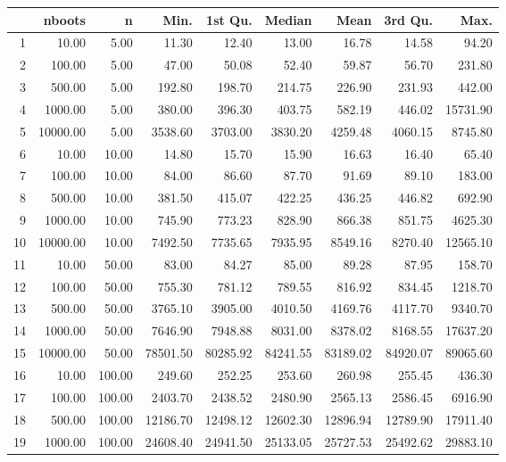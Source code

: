 \begin{table}[ht]
\centering
\begin{tabular}{rrrrrrrrr}
  \hline
 & nboots & n & Min. & 1st Qu. & Median & Mean & 3rd Qu. & Max. \\ 
  \hline
1 & 10.00 & 5.00 & 11.30 & 12.40 & 13.00 & 16.78 & 14.58 & 94.20 \\ 
  2 & 100.00 & 5.00 & 47.00 & 50.08 & 52.40 & 59.87 & 56.70 & 231.80 \\ 
  3 & 500.00 & 5.00 & 192.80 & 198.70 & 214.75 & 226.90 & 231.93 & 442.00 \\ 
  4 & 1000.00 & 5.00 & 380.00 & 396.30 & 403.75 & 582.19 & 446.02 & 15731.90 \\ 
  5 & 10000.00 & 5.00 & 3538.60 & 3703.00 & 3830.20 & 4259.48 & 4060.15 & 8745.80 \\ 
  6 & 10.00 & 10.00 & 14.80 & 15.70 & 15.90 & 16.63 & 16.40 & 65.40 \\ 
  7 & 100.00 & 10.00 & 84.00 & 86.60 & 87.70 & 91.69 & 89.10 & 183.00 \\ 
  8 & 500.00 & 10.00 & 381.50 & 415.07 & 422.25 & 436.25 & 446.82 & 692.90 \\ 
  9 & 1000.00 & 10.00 & 745.90 & 773.23 & 828.90 & 866.38 & 851.75 & 4625.30 \\ 
  10 & 10000.00 & 10.00 & 7492.50 & 7735.65 & 7935.95 & 8549.16 & 8270.40 & 12565.10 \\ 
  11 & 10.00 & 50.00 & 83.00 & 84.27 & 85.00 & 89.28 & 87.95 & 158.70 \\ 
  12 & 100.00 & 50.00 & 755.30 & 781.12 & 789.55 & 816.92 & 834.45 & 1218.70 \\ 
  13 & 500.00 & 50.00 & 3765.10 & 3905.00 & 4010.50 & 4169.76 & 4117.70 & 9340.70 \\ 
  14 & 1000.00 & 50.00 & 7646.90 & 7948.88 & 8031.00 & 8378.02 & 8168.55 & 17637.20 \\ 
  15 & 10000.00 & 50.00 & 78501.50 & 80285.92 & 84241.55 & 83189.02 & 84920.07 & 89065.60 \\ 
  16 & 10.00 & 100.00 & 249.60 & 252.25 & 253.60 & 260.98 & 255.45 & 436.30 \\ 
  17 & 100.00 & 100.00 & 2403.70 & 2438.52 & 2480.90 & 2565.13 & 2586.45 & 6916.90 \\ 
  18 & 500.00 & 100.00 & 12186.70 & 12498.12 & 12602.30 & 12896.94 & 12789.90 & 17911.40 \\ 
  19 & 1000.00 & 100.00 & 24608.40 & 24941.50 & 25133.05 & 25727.53 & 25492.62 & 29883.10 \\ 

\end{tabular}
\end{table}
